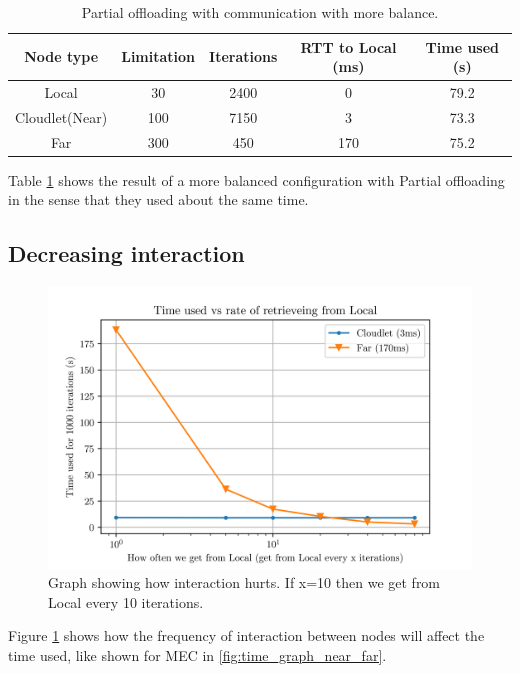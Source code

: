 \begin{table}[h!]
    \centering
    \begin{tabular}[c]{|c|c|c|c|c|}
        \hline
        Node type & Limitation & Iterations & RTT to Local (ms)& Time used (s)\\
        \hline
        \hline
        Local           & 30 & 2400 & 0 & 79.2  \\
        \hline
        Cloudlet(Near)  & 100 & 7150 & 3 & 73.3 \\
        \hline
        Far             & 300 & 450 & 170 & 75.2 \\
        \hline
    \end{tabular}
    \caption{Partial offloading with communication with more balance.}
    \label{tab:Cloudlet_partial_offloading_latency_balanced}
\end{table}
Table \ref{tab:Cloudlet_partial_offloading_latency_balanced} shows the result of a more balanced configuration with Partial offloading in the sense that they used about the same time.







\subsection{Decreasing interaction}
\begin{figure}[t]
    \centering
    \includegraphics[scale=1]{chapters/evaluation/figures/Cloudlet_latency.png}
    \caption{Graph showing how interaction hurts. If x=10 then we get from Local every 10 iterations.}
    \label{fig:Cloudlet_latency_near_far_comparison}
\end{figure}
Figure \ref{fig:Cloudlet_latency_near_far_comparison} shows how the frequency of interaction between nodes will affect the time used, like shown for MEC in \ref{fig:time_graph_near_far}. 


